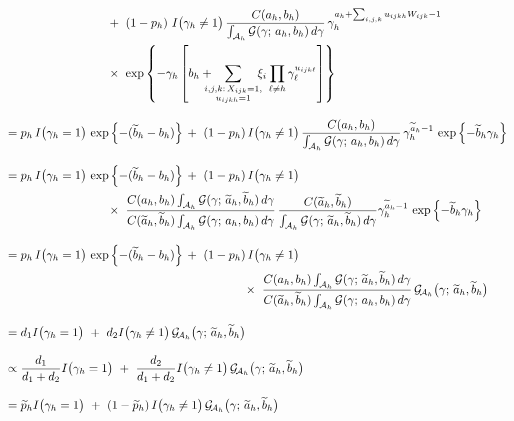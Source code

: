 \documentclass[11pt]{article}
\newcommand{\ind}{I}
\newcommand{\gammaExprUisOne}{ \hspace{3mm} \sum_{\mathclap{\substack{i,j,k{:}\, X_{ijk}=1, \\ u_{ijkh} = 1}}} \hspace{4mm} \xi_i \prod_{\ell \ne h} \gamma_\ell^{ u_{ijk\ell} } }
\begin{document}
\begin{enumerate}[label=Step \arabic*., leftmargin=13mm, itemsep=10mm]
\begin{align*}
& \hspace{30mm} +~ (1 - p_h)~ \ind\big(\gamma_h \ne 1 \big)\, \frac{ C(a_h,b_h) }{ \int_{\mathcal{A}_h} \mathcal{G}(\gamma;\, a_h,b_h)\, d\gamma }\, \gamma_h^{ a_h + \sum_{i,j,k} u_{ijkh} W_{ijk} - 1 } \\
& \hspace{30mm} \times~ \exp\left\{ -\gamma_h \left[ b_h + \gammaExprUisOne  \right] \right\} \\[2ex]
&= p_h\, \ind\big( \gamma_h = 1 \big)\, \exp\left\{ -(\widetilde{b}_h - b_h) \right\} \,+~ (1 - p_h)\, \ind\big( \gamma_h \ne 1 \big)\, \frac{ C(a_h,b_h) }{ \int_{\mathcal{A}_h} \mathcal{G}(\gamma;\, a_h,b_h)\, d\gamma }\, \gamma_h^{ \widetilde{a}_h - 1 }\, \exp\left\{ -\widetilde{b}_h \gamma_h \right\} \\[2ex]
&= p_h\, \ind\big( \gamma_h = 1 \big)\, \exp\left\{ -(\widetilde{b}_h - b_h) \right\} \,+~ (1 - p_h)\, \ind\big( \gamma_h \ne 1 \big) \\
& \hspace{30mm} \times~ \frac{ C(a_h,b_h) \int_{\mathcal{A}_h} \mathcal{G}(\gamma;\, \widetilde{a}_h, \widetilde{b}_h)\, d\gamma }{ C(\widetilde{a}_h, \widetilde{b}_h) \int_{\mathcal{A}_h} \mathcal{G}(\gamma;\, a_h, b_h)\, d\gamma }\, \frac{ C( \widetilde{a}_h, \widetilde{b}_h) }{ \int_{\mathcal{A}_h} \mathcal{G}(\gamma;\, \widetilde{a}_h, \widetilde{b}_h)\, d\gamma } \gamma_h^{ \widetilde{a}_h - 1 }\, \exp\left\{ -\widetilde{b}_h \gamma_h \right\} \\[2ex]
&= p_h\, \ind\big( \gamma_h = 1 \big)\, \exp\left\{ -(\widetilde{b}_h - b_h) \right\} \,+~ (1 - p_h)\, \ind\big( \gamma_h \ne 1 \big)\, \\
& \hspace{70mm} \times~ \frac{ C(a_h,b_h) \int_{\mathcal{A}_h} \mathcal{G}(\gamma;\, \widetilde{a}_h, \widetilde{b}_h)\, d\gamma }{ C(\widetilde{a}_h, \widetilde{b}_h) \int_{\mathcal{A}_h} \mathcal{G}(\gamma;\, a_h, b_h)\, d\gamma }\, \mathcal{G}_{\!\mathcal{A}_h} \big(\gamma;\, \widetilde{a}_h, \widetilde{b}_h\big) \\[2ex]
&= d_1 \ind\big( \gamma_h = 1 \big) ~+~ d_2 \ind\big( \gamma_h \ne 1 \big)\, \mathcal{G}_{\!\mathcal{A}_h} \big(\gamma;\, \widetilde{a}_h, \widetilde{b}_h\big) \\[2ex]
&\propto \frac{ d_1 }{ d_1 + d_2 } \ind\big( \gamma_h = 1 \big) ~+~ \frac{ d_2 }{ d_1 + d_2 } \ind\big( \gamma_h \ne 1 \big)\, \mathcal{G}_{\!\mathcal{A}_h} \big(\gamma;\, \widetilde{a}_h, \widetilde{b}_h\big) \\[2ex]
&= \widetilde{p}_h \ind\big( \gamma_h = 1 \big) ~+~ (1 - \widetilde{p}_h)\, \ind\big( \gamma_h \ne 1 \big)\, \mathcal{G}_{\!\mathcal{A}_h} \big(\gamma;\, \widetilde{a}_h, \widetilde{b}_h\big)
\end{align*} 





\end{enumerate}
\end{document}
